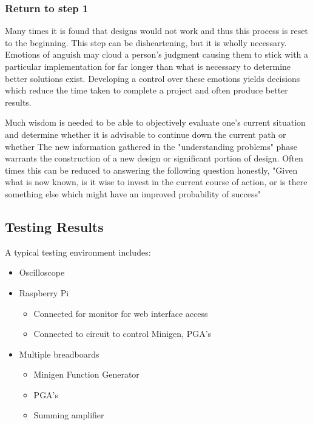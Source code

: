 \documentclass{article}	%
\begin{document}
\begin{multicols}{2}
\subsubsection{Return to step 1}
Many times it is found that designs would not work
and thus this process is reset to the beginning.
This step can be disheartening, but
it is wholly necessary.
Emotions of anguish may cloud a person's judgment
causing them to stick with a particular implementation
for far longer than what is necessary to determine 
better solutions exist.
Developing a control over these emotions
yields decisions which reduce the time
taken to complete a project and
often produce better results.

Much wisdom is needed to be able to objectively 
evaluate one's current situation and determine 
whether it is advisable to
continue down the current path or whether
The new information gathered in the "understanding problems" phase
warrants the construction of a new design 
or significant portion of design.
Often times this can be reduced to answering the following question honestly,
"Given what is now known,
is it wise to invest in the current course of action, or
is there something else which might have an improved probability of success"


\subsection{Testing Results}

A typical testing environment includes:
\begin{itemize}
\item Oscilloscope
\item Raspberry Pi
  \begin{itemize}
  \item Connected for monitor for web interface access
  \item Connected to circuit to control Minigen, PGA's
  \end{itemize}
\item Multiple breadboards
  \begin{itemize}
  \item Minigen Function Generator
  \item PGA's
  \item Summing amplifier
  \end{itemize}
\end{itemize}


\end{multicols}
\end{document}

